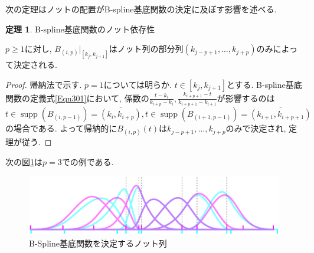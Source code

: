 \documentclass{jsarticle}
\newcommand\Cl[1]{\overline{#1}}
\newcommand\pare[1]{(#1)}
\DeclareMathOperator{\supp}{supp}
\theoremstyle{definition}%
\newtheorem{thm}{定理}
\begin{document}
次の定理はノットの配置がB-spline基底関数の決定に及ぼす影響を述べる.
\begin{screen}
	\begin{thm}
		\label{Thm302}
		B-spline基底関数のノット依存性

		$p\ge 1$に対し, $B_{(i,p)}|_{[k_j,k_{j+1}]}$はノット列の部分列$ \pare{k_{j-p+1}, \dots ,k_{j+p}} $のみによって決定される.
	\end{thm}
\end{screen}
\begin{proof}
    帰納法で示す.
    $p=1$については明らか.
    $t\in [k_{j},k_{j+1}]$とする.
    B-spline基底関数の定義式\eqref{Eqn301}において, 係数の$\frac{t-k_{i}}{k_{i+p}-k_{i}},\frac{k_{i+p+1}-t}{k_{i+p+1}-k_{i+1}}$が影響するのは$t\in \supp(B_{(i,p-1)})=\Cl{(k_{i},k_{i+p})}, t\in \supp(B_{(i+1,p-1)})=\Cl{(k_{i+1},k_{i+p+1})}$の場合である.
    よって帰納的に$B_{(i,p)}(t)$は$k_{j-p+1},\dots,k_{j+p}$のみで決定され, 定理が従う.
\end{proof}
次の図\ref{Fig303}は$p=3$での例である.
\addtocounter{footnote}{-1}
\begin{figure}[H]
	\centering
    \includegraphics[page=1,clip,width=140mm]{figA.pdf}
	\caption{B-Spline基底関数を決定するノット列\protect\footnotemark}
	\label{Fig303}
\end{figure}
\end{document}
